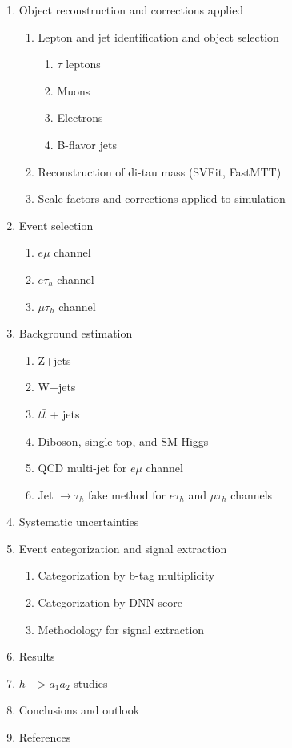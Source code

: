 \documentclass{article}
\begin{document}
\begin{enumerate}
    \item Object reconstruction and corrections applied
        \begin{enumerate}
            \item Lepton and jet identification and object selection
                \begin{enumerate}
                    \item $\tau$ leptons
                    \item Muons 
                    \item Electrons
                    \item B-flavor jets
                \end{enumerate}
            \item Reconstruction of di-tau mass (SVFit, FastMTT)
            \item Scale factors and corrections applied to simulation
        \end{enumerate}
    \item Event selection 
        \begin{enumerate}
            \item $e\mu$ channel
            \item $e\tau_{h}$ channel
            \item $\mu\tau_{h}$ channel
        \end{enumerate}
    \item Background estimation 
        \begin{enumerate}
            \item Z+jets
            \item W+jets
            \item $t\bar{t}$ + jets
            \item Diboson, single top, and SM Higgs
            \item QCD multi-jet for $e\mu$ channel
            \item Jet $\rightarrow \tau_{h}$ fake method for $e\tau_{h}$ and $\mu\tau_{h}$ channels
        \end{enumerate}
    \item Systematic uncertainties
    \item Event categorization and signal extraction
        \begin{enumerate}
            \item Categorization by b-tag multiplicity
            \item Categorization by DNN score
            \item Methodology for signal extraction
        \end{enumerate}
    \item Results
    \item $h->a_1 a_2$ studies
    \item Conclusions and outlook
    \item References
\end{enumerate}
\end{document}
